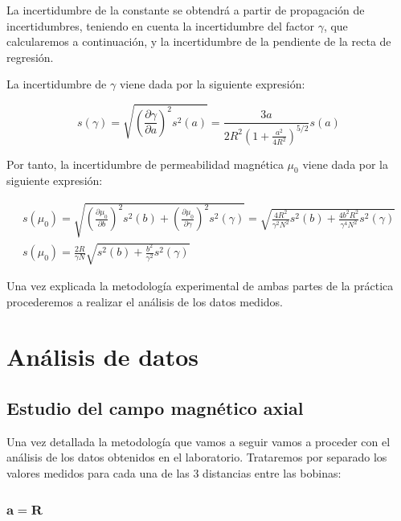 \documentclass[a4paper,12pt,titlepage]{article}
\begin{document}
La incertidumbre de la constante se obtendrá a partir de propagación de incertidumbres, teniendo en cuenta la incertidumbre del factor $\gamma$, que calcularemos a continuación, y la incertidumbre de la pendiente de la recta de regresión.

\par La incertidumbre de $\gamma$ viene dada por la siguiente expresión:

\begin{equation}
    s(\gamma) = \sqrt{\left (\frac{\partial \gamma}{\partial a}\right )^2 s^2(a)} = \frac{3a}{2R^2 \left (1+ \frac{a^2}{4R^2} \right )^{5/2}} s(a)
\end{equation}

Por tanto, la incertidumbre de permeabilidad magnética $\mu_0$ viene dada por la siguiente expresión:

\begin{equation}
    \begin{gathered}
    s(\mu_0) = \sqrt{\left (\frac{\partial \mu_0 }{\partial b} \right )^2s^2(b) + \left (\frac{\partial \mu_0}{\partial \gamma} \right )^2s^2(\gamma)} = \sqrt{\frac{4R^2}{\gamma^2 N^2} s^2(b) + \frac{4b^2R^2}{\gamma^4 N^2} s^2(\gamma)} \\
    s(\mu_0) = \frac{2R}{\gamma N} \sqrt{s^2(b) + \frac{b^2}{\gamma ^2}s^2(\gamma)}
    \end{gathered}
    \label{Incertidumbre permeabilidad}
\end{equation}

Una vez explicada la metodología experimental de ambas partes de la práctica procederemos a realizar el análisis de los datos medidos.

\section{Análisis de datos}

\subsection{Estudio del campo magnético axial}

Una vez detallada la metodología que vamos a seguir vamos a proceder con el análisis de los datos obtenidos en el laboratorio. Trataremos por separado los valores medidos para cada una de las 3 distancias entre las bobinas:

\subsubsection{$\mathbf{a=R}$}
\end{document}

